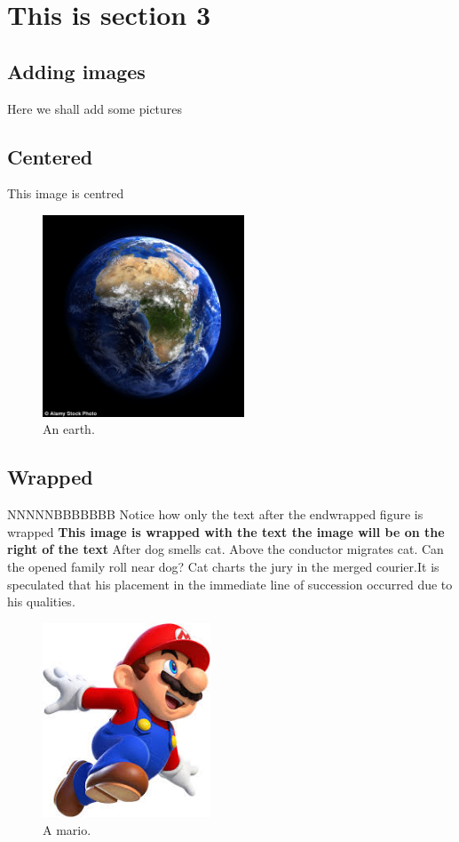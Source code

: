 \documentclass[12pt]{article}
\begin{document}
 

\section{This is section 3}
\subsection{Adding images}
Here we shall add some pictures\\
\subsection{Centered}
This image is centred
\begin{figure}[H]
  \includegraphics[width=6cm,height=6cm]{earth.jpg}
  \centering
  \caption{An earth.}
  \label{fig:boat1}
\end{figure}

\subsection{Wrapped}
NNNNNBBBBBBB
Notice how only the text after the end{wrapped} figure is wrapped
\textbf{This image is wrapped with the text the image will be on the right of the text} 
After dog smells cat. Above the conductor migrates cat. Can the opened family roll near dog? Cat charts the jury in the merged courier.It is speculated that his placement in the immediate line of succession occurred due to his qualities.

\begin{figure}
\centering
  \includegraphics[width=5cm]{mario.png}
  \caption{A mario.}
  \label{fig:a mario}
  \end{figure}
  
\end{document}
